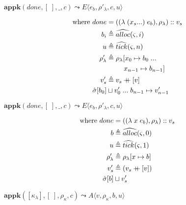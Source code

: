 \documentclass[12pt,draft]{article}
\newcommand\mdoubleplus{\ensuremath{\mathbin{+\mkern-9mu+}}}
\newcommand{\lamsyn}[2]{(\lambda\;(#1 ...)\;#2)}
\newcommand{\vararglamsyn}[2]{(\lambda\;#1\;#2)}
\begin{document}
\begin{multicols*}{2}
\vfill\null
\columnbreak


\begin{center}
  $\textbf{appk}(done, [\;], \_, c)
  \leadsto E\langle e_b , \rho'_\lambda , c , u \rangle$
\end{center}
\vspace{-7mm}
\begin{align*}
\text{where } done &= (\lamsyn{x_s}{e_b}, \rho_{\lambda}) :: v_s \\
b_i &\triangleq \widehat{alloc}(\varsigma, i) \\
u &\triangleq \widehat{tick}(\varsigma, n) \\
\rho'_{\lambda} &\triangleq \rho_{\lambda}[x_0 \mapsto b_0 \;... \\
&\;\;\;\;\;\;\;\;\;x_{n-1} \mapsto b_{n-1}] \\
v'_s &\triangleq v_s \mdoubleplus [v] \\
\hat{\sigma}[b_0] &\sqcup v'_0 \;...\; b_{n-1} \mapsto v'_{n-1}
\end{align*}
\begin{center}
  $\textbf{appk}(done, [\;], \_, c)
  \leadsto E\langle e_b, \rho'_\lambda , c , u \rangle$
\end{center}
\vspace{-7mm}
\begin{align*}
\text{where } done &= (\vararglamsyn{x}{e_b}, \rho_{\lambda}) :: v_s \\
b &\triangleq \widehat{alloc}(\varsigma, 0) \\
u &\triangleq \widehat{tick}(\varsigma, 1) \\
\rho'_{\lambda} &\triangleq \rho_{\lambda}[x \mapsto b] \\
v'_s &\triangleq (v_s \mdoubleplus [v]) \\
\hat{\sigma}[b] &\sqcup v'_s
\end{align*}
\begin{center}
  $\textbf{appk}([\kappa_\lambda] , [\;] , \rho_\kappa , c)
  \leadsto A\langle v , \rho_\kappa , b , u \rangle$
\end{center}
\vspace{-7mm}
\begin{align*}

\end{align*}
\end{multicols*}
\end{document}
